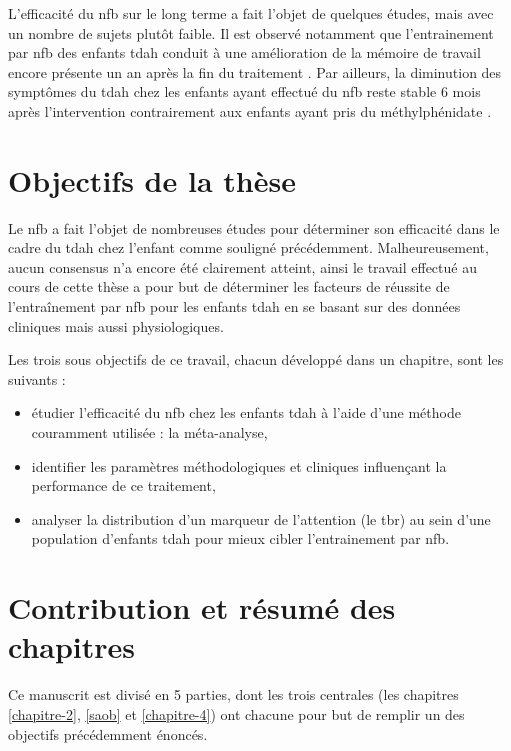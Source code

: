 L'efficacité du \gls{nfb} sur le long terme a fait l'objet de quelques études, mais avec un nombre de sujets plutôt faible. Il est observé notamment
que l'entrainement par \gls{nfb} des enfants \gls{tdah} conduit à une amélioration de la mémoire de travail encore présente un an après la fin du traitement
\citep{Dobrakowski2019}. Par ailleurs, la diminution des symptômes du \gls{tdah} chez les enfants ayant effectué du \gls{nfb} reste stable 6 mois après 
l'intervention contrairement aux enfants ayant pris du méthylphénidate \citep{Gelade2018}. 



\section{Objectifs de la thèse}

Le \gls{nfb} a fait l'objet de nombreuses études pour déterminer son efficacité dans le cadre du \gls{tdah} chez l'enfant comme souligné précédemment.
Malheureusement, aucun consensus n'a encore été clairement atteint, ainsi le travail effectué au cours de cette thèse a pour but de déterminer les facteurs 
de réussite de l'entraînement par \gls{nfb} pour les enfants \gls{tdah} en se basant sur des données cliniques mais aussi physiologiques. 

Les trois sous objectifs de ce travail, chacun développé dans un chapitre, sont les suivants :
\begin{itemize}
\item étudier l'efficacité du \gls{nfb} chez les enfants \gls{tdah} à l'aide d'une méthode couramment utilisée : la méta-analyse,
\item identifier les paramètres méthodologiques et cliniques influençant la performance de ce traitement,
\item analyser la distribution d'un marqueur de l'attention (le \gls{tbr}) au sein d'une population d'enfants \gls{tdah} pour mieux cibler
l'entrainement par \gls{nfb}. 
\end{itemize}

\section{Contribution et résumé des chapitres}

Ce manuscrit est divisé en 5 parties, dont les trois centrales (les chapitres \ref{chapitre-2}, \ref{saob} et \ref{chapitre-4}) ont chacune pour but de remplir 
un des objectifs précédemment énoncés.

